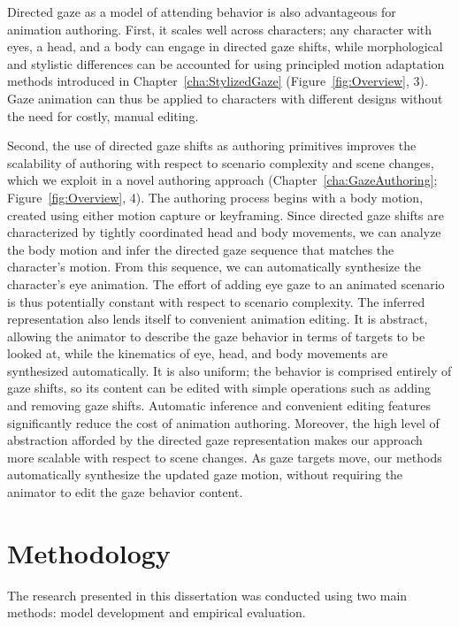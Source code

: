 Directed gaze as a model of attending behavior is also advantageous for animation authoring.
First, it scales well across characters; any character with eyes, a head, and a body can engage in directed gaze shifts, while morphological and stylistic differences can be accounted for using principled motion adaptation methods introduced in Chapter~\ref{cha:StylizedGaze} (Figure~\ref{fig:Overview}, 3). Gaze animation can thus be applied to characters with different designs without the need for costly, manual editing.

Second, the use of directed gaze shifts as authoring primitives improves the scalability of authoring with respect to scenario complexity and scene changes, which we exploit in a novel authoring approach (Chapter~\ref{cha:GazeAuthoring}; Figure~\ref{fig:Overview}, 4). The authoring process begins with a body motion, created using either motion capture or keyframing. Since directed gaze shifts are characterized by tightly coordinated head and body movements, we can analyze the body motion and infer the directed gaze sequence that matches the character's motion. From this sequence, we can automatically synthesize the character's eye animation. The effort of adding eye gaze to an animated scenario is thus potentially constant with respect to scenario complexity.
The inferred representation also lends itself to convenient animation editing. It is abstract, allowing the animator to describe the gaze behavior in terms of targets to be looked at, while the kinematics of eye, head, and body movements are synthesized automatically.
It is also uniform; the behavior is comprised entirely of gaze shifts, so its content can be edited with simple operations such as adding and removing gaze shifts.
Automatic inference and convenient editing features significantly reduce the cost of animation authoring.
Moreover, the high level of abstraction afforded by the directed gaze representation makes our approach more scalable with respect to scene changes. As gaze targets move, our methods automatically synthesize the updated gaze motion, without requiring the animator to edit the gaze behavior content.

\section{Methodology}

The research presented in this dissertation was conducted using two main methods: model development and empirical evaluation.

